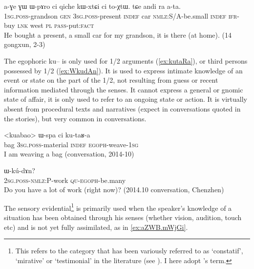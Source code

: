 \documentclass[oldfontcommands,oneside,a4paper,11pt]{article}
\newcommand{\ipa}[1]{{\phon#1}} %
\newcommand{\factual}[1]{\textsc{:fact}}
\begin{document}
\begin{exe}
\ex \label{ex:ata}
\gll
 \ipa{a-ɣe}  	\ipa{ɣɯ}  	\ipa{ɯ-pɤro}  	\ipa{ci}  	 qiche 	\ipa{kɯ-xtɕi}  	\ipa{ci}  	\ipa{to-χtɯ.}  	\ipa{tɕe}  	\ipa{andi}  	\ipa{ra}  	\ipa{a-ta.}  	\\
 \textsc{1sg.poss}-grandson \textsc{gen} \textsc{3sg.poss}-present \textsc{indef} car \textsc{nmlz}:S/A-be.small \textsc{indef} \textsc{ifr}-buy \textsc{lnk} west \textsc{pl} \textsc{pass}-put\factual{} \\
 \glt He bought a present, a small car for my grandson, it is there (at home). (14 gongxun, 2-3)
  \end{exe}

The egophoric \ipa{ku--} is only used for 1/2 arguments (\ref{ex:kutaRa}), or third persons possessed by 1/2 (\ref{ex:WkudAn}). It is used to express intimate knowledge of an event or state on the part of the 1/2, not resulting from guess or recent information mediated through the senses. It cannot express a general or gnomic state of affair, it is only used to refer to an ongoing state or action. It is virtually absent from procedural texts and narratives (expect in conversations quoted in the stories), but very common in conversations.


\begin{exe}
\ex \label{ex:kutaRa}
\gll 
<kuabao> 	\ipa{ɯ-spa}  	\ipa{ci}  	\ipa{ku-taʁ-a}  \\
bag \textsc{3sg.poss}-material \textsc{indef} \textsc{egoph}-weave-\textsc{1sg} \\
\glt I am weaving a bag (conversation, 2014-10)
\end{exe}

 
 \begin{exe}
\ex \label{ex:WkudAn}
\gll \ipa{nɤ-kɤ-nɤma} 	\ipa{ɯ-kú-dɤn?}  \\
 \textsc{2sg.poss-nmlz:P}-work \textsc{qu-egoph}-be.many \\
\glt Do you have a lot of work (right now)? (2014.10 conversation, Chenzhen)
\end{exe}

The sensory evidential\footnote{This refers to the category that has been variously referred to as `constatif', `mirative' or `testimonial' in the literature (see \citealt{hill12mirativity}). I here adopt \citet{tournadre14evidentiality}'s term.} is primarily used when the speaker's knowledge of a situation has been obtained through his senses (whether vision, audition, touch etc) and is not yet fully assimilated, as in \ref{ex:aZWB.mWjGi}.
\end{document}
